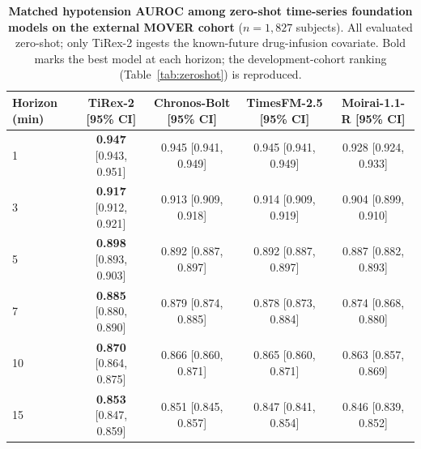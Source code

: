 \begin{table}[t]
\centering\footnotesize
\caption{\textbf{Matched hypotension AUROC among zero-shot time-series foundation models on the external MOVER cohort} ($n=1{,}827$ subjects). All evaluated zero-shot; only TiRex-2 ingests the known-future drug-infusion covariate. Bold marks the best model at each horizon; the development-cohort ranking (Table~\ref{tab:zeroshot}) is reproduced.}
\label{tab:zeroshot_mover}
\begin{tabular}{lcccc}
\toprule
Horizon (min) & TiRex-2 [95\% CI] & Chronos-Bolt [95\% CI] & TimesFM-2.5 [95\% CI] & Moirai-1.1-R [95\% CI] \\
\midrule
1  & \textbf{0.947} [0.943, 0.951] & 0.945 [0.941, 0.949] & 0.945 [0.941, 0.949] & 0.928 [0.924, 0.933] \\
3  & \textbf{0.917} [0.912, 0.921] & 0.913 [0.909, 0.918] & 0.914 [0.909, 0.919] & 0.904 [0.899, 0.910] \\
5  & \textbf{0.898} [0.893, 0.903] & 0.892 [0.887, 0.897] & 0.892 [0.887, 0.897] & 0.887 [0.882, 0.893] \\
7  & \textbf{0.885} [0.880, 0.890] & 0.879 [0.874, 0.885] & 0.878 [0.873, 0.884] & 0.874 [0.868, 0.880] \\
10 & \textbf{0.870} [0.864, 0.875] & 0.866 [0.860, 0.871] & 0.865 [0.860, 0.871] & 0.863 [0.857, 0.869] \\
15 & \textbf{0.853} [0.847, 0.859] & 0.851 [0.845, 0.857] & 0.847 [0.841, 0.854] & 0.846 [0.839, 0.852] \\
\bottomrule
\end{tabular}
\end{table}

